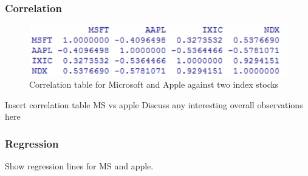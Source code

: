 \documentclass[paper=a4, fontsize=11pt]{scrartcl} %
\numberwithin{equation}{section} %
\numberwithin{figure}{section} %
\numberwithin{table}{section} %
\begin{document}
\subsubsection{Correlation}

\begin{figure}[!htb]
  \includegraphics[width=\linewidth]{graph/cor7.png}
  \caption{Correlation table for Microsoft and Apple against two index stocks}
\endminipage\hfill
\end{figure}

Insert correlation table MS vs apple
Discuss any interesting overall observations here

\subsubsection{Regression}
Show regression lines for MS and apple. 
\end{document}
